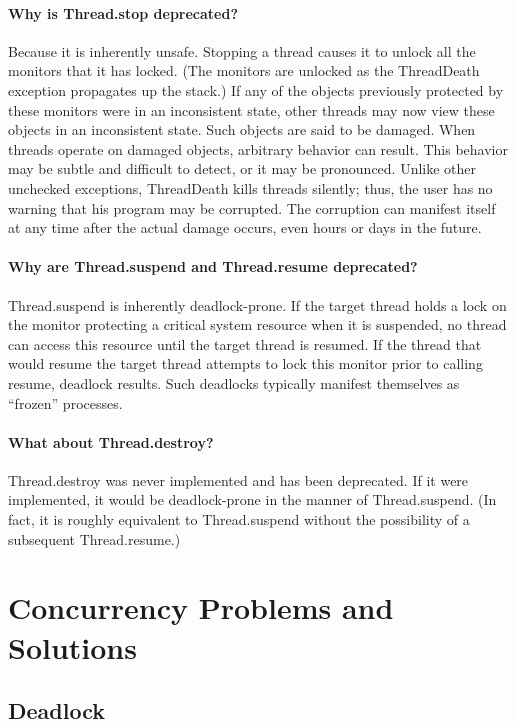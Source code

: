 \documentclass{article}
\begin{document}
\paragraph{Why is Thread.stop deprecated?}
Because it is inherently unsafe. Stopping a thread causes it to unlock all the monitors that it has locked. (The monitors are unlocked as the ThreadDeath exception propagates up the stack.) If any of the objects previously protected by these monitors were in an inconsistent state, other threads may now view these objects in an inconsistent state. Such objects are said to be damaged. When threads operate on damaged objects, arbitrary behavior can result. This behavior may be subtle and difficult to detect, or it may be pronounced. Unlike other unchecked exceptions, ThreadDeath kills threads silently; thus, the user has no warning that his program may be corrupted. The corruption can manifest itself at any time after the actual damage occurs, even hours or days in the future.

\paragraph{Why are Thread.suspend and Thread.resume deprecated?}
Thread.suspend is inherently deadlock-prone. If the target thread holds a lock on the monitor protecting a critical system resource when it is suspended, no thread can access this resource until the target thread is resumed. If the thread that would resume the target thread attempts to lock this monitor prior to calling resume, deadlock results. Such deadlocks typically manifest themselves as ``frozen'' processes.

\paragraph{What about Thread.destroy?}
Thread.destroy was never implemented and has been deprecated. If it were implemented, it would be deadlock-prone in the manner of Thread.suspend. (In fact, it is roughly equivalent to Thread.suspend without the possibility of a subsequent Thread.resume.)

\section{Concurrency Problems and Solutions}

\subsection{Deadlock}
\end{document}
